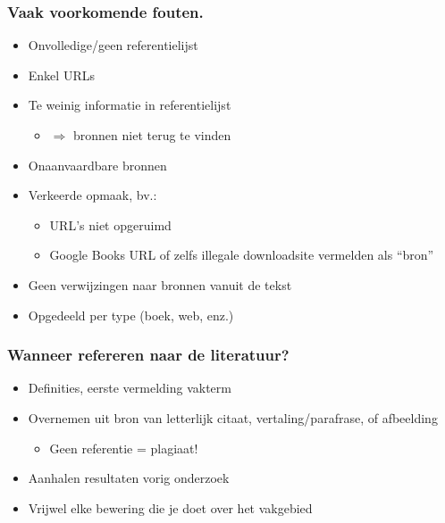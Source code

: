 \documentclass[aspectratio=169]{beamer}
\begin{document}
\begin{frame}
  \frametitle{Vaak voorkomende fouten.}

  \begin{itemize}
    \item Onvolledige/geen referentielijst
    \item Enkel URLs
    \item Te weinig informatie in referentielijst
          \begin{itemize}
            \item $\Rightarrow$ bronnen niet terug te vinden
          \end{itemize}
    \item Onaanvaardbare bronnen
    \item Verkeerde opmaak, bv.:
          \begin{itemize}
            \item URL's niet opgeruimd
            \item Google Books URL of zelfs illegale downloadsite vermelden als ``bron''
          \end{itemize}
    \item Geen verwijzingen naar bronnen vanuit de tekst
    \item Opgedeeld per type (boek, web, enz.)
  \end{itemize}
\end{frame}

\begin{frame}
  \frametitle{Wanneer refereren naar de literatuur?}

  \begin{itemize}
    \item Definities, eerste vermelding vakterm
    \item Overnemen uit bron van letterlijk citaat, vertaling/parafrase, of afbeelding
          \begin{itemize}
            \item Geen referentie = \alert{plagiaat!}
          \end{itemize}
    \item Aanhalen resultaten vorig onderzoek
    \item Vrijwel elke bewering die je doet over het vakgebied
  \end{itemize}

  \bigskip

\end{frame}
\end{document}
